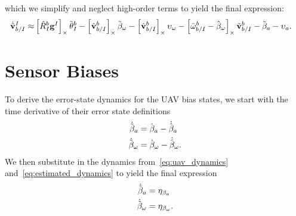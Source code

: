 which we simplify and neglect high-order terms to yield the final
expression:
\begin{align}
  \dot{\tilde{\mathrm{\mathbf{v}}}}_{b/I}^I
  \approx&
  \left[  \hat{R}_I^b \mathrm{\mathbf{g}}^I  \right]_{\times} \tilde{\mathrm{\mathbf{\theta}}}_I^b 
  -
  \left[  \hat{\mathrm{\mathbf{v}}}_{b/I}^b  \right]_{\times} \tilde{\mathrm{\mathbf{\beta}}}_\omega
  -
  \left[  \hat{\mathrm{\mathbf{v}}}_{b/I}^b  \right]_{\times} \mathrm{\mathbf{\upsilon}}_\omega
  -
  \left[  \bar{\omega}_{b/I}^b - \hat{\mathrm{\mathbf{\beta}}}_\omega  \right]_{\times}
  \tilde{\mathrm{\mathbf{v}}}_{b/I}^b
  -
  \tilde{\mathrm{\mathbf{\beta}}}_a
  -
  \mathrm{\mathbf{\upsilon}}_a.
\end{align}

\section{Sensor Biases}
To derive the error-state dynamics for the UAV bias states, we start with the
time derivative of their error state definitions
\begin{align}
  \dot{\tilde{\mathrm{\mathbf{\beta}}}}_a &= \dot{\mathrm{\mathbf{\beta}}}_a -
  \dot{\hat{\mathrm{\mathbf{\beta}}}}_a \\
  \dot{\tilde{\mathrm{\mathbf{\beta}}}}_\omega &= \dot{\mathrm{\mathbf{\beta}}}_\omega -
  \dot{\hat{\mathrm{\mathbf{\beta}}}}_\omega.
\end{align}
We then substitute in the dynamics from~\eqref{eq:uav_dynamics}
and~\eqref{eq:estimated_dynamics} to yield the final expression
\begin{align}
  \dot{\tilde{\mathrm{\mathbf{\beta}}}}_a &= \mathrm{\mathbf{\eta}}_{\beta_a} \\
  \dot{\tilde{\mathrm{\mathbf{\beta}}}}_\omega &= \mathrm{\mathbf{\eta}}_{\beta_\omega}.
\end{align}


